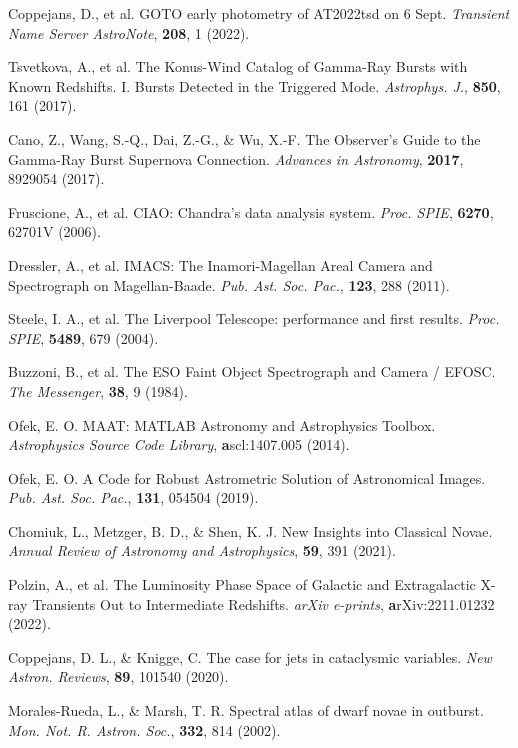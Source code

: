 \documentclass{nature_plusfigure}
\newcommand{\mn}{{Mon. Not. R. Astron. Soc.}}
\newcommand{\nar}{{New Astron. Reviews}}
\newcommand{\mnras}{\mn}
\newcommand{\apj}{{Astrophys. J.}}
\newcommand{\aap}{{Astron. Astrophys.}}
\newcommand{\pasp}{{Pub. Ast. Soc. Pac.}}
\newcommand{\procspie}{Proc. SPIE}
\newcommand{\araa}{Annual Review of Astronomy and Astrophysics}
\begin{document}
\begin{methods}
\begin{thebibliography}{10}
 Coppejans, D., et al. GOTO early photometry of AT2022tsd on 6 Sept. \emph{Transient Name Server AstroNote}, \textbf{208}, 1 (2022). 

 Tsvetkova, A., et al. The Konus-Wind Catalog of Gamma-Ray Bursts with Known Redshifts. I. Bursts Detected in the Triggered Mode. \emph{\apj}, \textbf{850}, 161 (2017). 

 Cano, Z., Wang, S.-Q., Dai, Z.-G., \& Wu, X.-F. The Observer's Guide to the Gamma-Ray Burst Supernova Connection. \emph{Advances in Astronomy}, \textbf{2017}, 8929054 (2017). 

 Fruscione, A., et al. CIAO: Chandra's data analysis system. \emph{\procspie}, \textbf{6270}, 62701V (2006). 

 Dressler, A., et al. IMACS: The Inamori-Magellan Areal Camera and Spectrograph on Magellan-Baade. \emph{\pasp}, \textbf{123}, 288 (2011). 


 Steele, I. A., et al. The Liverpool Telescope: performance and first results. \emph{\procspie}, \textbf{5489}, 679 (2004). 

 Buzzoni, B., et al. The ESO Faint Object Spectrograph and Camera / EFOSC. \emph{The Messenger}, \textbf{38}, 9 (1984). 

 Ofek, E. O. MAAT: MATLAB Astronomy and Astrophysics Toolbox. \emph{Astrophysics Source Code Library}, \textbf ascl:1407.005 (2014). 

 Ofek, E. O. A Code for Robust Astrometric Solution of Astronomical Images. \emph{\pasp}, \textbf{131}, 054504 (2019). 

 Chomiuk, L., Metzger, B. D., \& Shen, K. J. New Insights into Classical Novae. \emph{\araa}, \textbf{59}, 391 (2021). 

 Polzin, A., et al. The Luminosity Phase Space of Galactic and Extragalactic X-ray Transients Out to Intermediate Redshifts. \emph{arXiv e-prints}, \textbf arXiv:2211.01232 (2022). 

 Coppejans, D. L., \& Knigge, C. The case for jets in cataclysmic variables. \emph{\nar}, \textbf{89}, 101540 (2020). 

 Morales-Rueda, L., \& Marsh, T. R. Spectral atlas of dwarf novae in outburst. \emph{\mnras}, \textbf{332}, 814 (2002). 


\end{thebibliography}
\end{methods}
\end{document}
